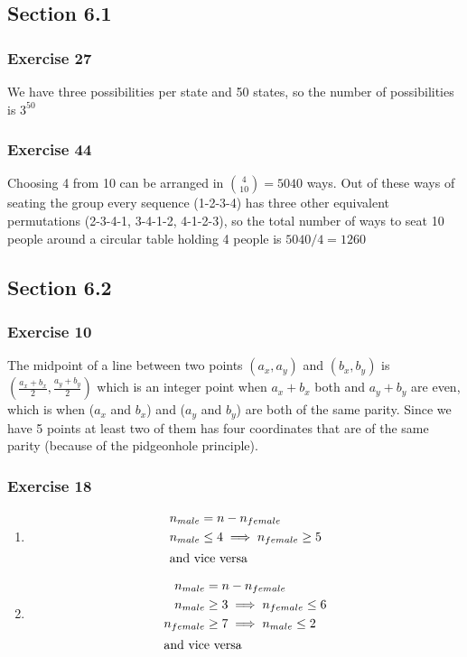 \documentclass[a4paper]{article}
\newcommand{\ex}[1]{\subsubsection*{#1}}
\begin{document}
\vspace{1em}
\subsection*{Section 6.1}

\ex{Exercise 27}
We have three possibilities per state and 50 states, so the number of possibilities is \(3^{50}\)


\ex{Exercise 44} 
Choosing 4 from 10 can be arranged in \(\binom{4}{10} = 5040\) ways. Out of
these ways of seating the group every sequence (1-2-3-4) has three other
equivalent permutations (2-3-4-1, 3-4-1-2, 4-1-2-3), so the total number of
ways to seat 10 people around a circular table holding 4 people is \(5040/4 =
1260\)



\subsection*{Section 6.2}
\ex{Exercise 10}
The midpoint of a line between two points \((a_x,a_y)\) and \((b_x,b_y)\) is \((\frac{a_x+b_x}{2},\frac{a_y+b_y}{2})\) which is an integer point when \(a_x + b_x\) both and \(a_y + b_y\) are even, which is when (\(a_x\) and \(b_x\)) and (\(a_y\) and \(b_y\)) are both of the same parity. Since we have 5 points at least two of them has four coordinates that are of the same parity (because of the pidgeonhole principle).

\ex{Exercise 18}

\begin{enumerate}[label=\alph*)]
    \item 
        \begin{align}
            n_{male} &= n - n_{female} \\
            n_{male} &\leq 4 \implies n_{female} \geq 5 \\
            \intertext{and vice versa}
        \end{align}

    \item
        \begin{align}
            n_{male} &= n - n_{female} \\
            n_{male} &\geq 3 \implies n_{female} \leq 6 \\
            n_{female} &\geq 7 \implies n_{male} \leq 2 \\
            \intertext{and vice versa}
        \end{align}
\end{enumerate}
\end{document}
